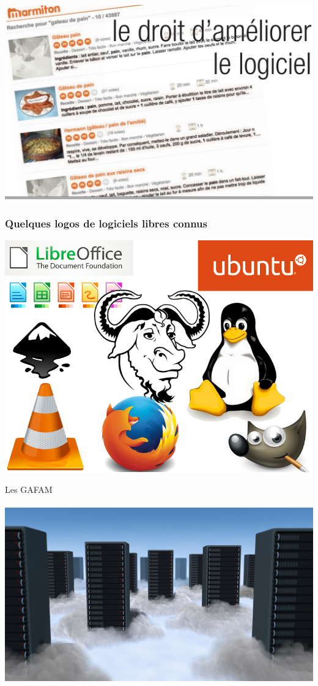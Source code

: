 \documentclass{beamer}
\begin{document}
\begin{frame}
\includegraphics[scale=0.48] {./images/Cuisine04.jpg} 
\end{frame}

\begin{frame}
\frametitle{Quelques logos de logiciels libres connus}
\includegraphics[scale=0.5] {./images/Le_logiciel_libre.png} 
\end{frame}

\begin{frame}
\begin{center}
\Huge{Les GAFAM}
\\~\\
\includegraphics[scale=0.4]{./images/cloud_gafam.jpg}
\end{center}
\end{frame}
\end{document}
